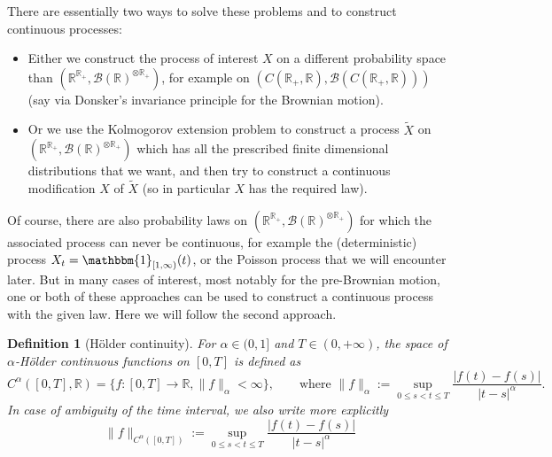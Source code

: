 \documentclass{article}
\newcommand{\coloneq}{:=}
\newcommand{\emph}[1]{{\em #1\/}}
\newenvironment{itemizeminus}{\begin{itemize} \renewcommand{\labelitemi}{$-$}\renewcommand{\labelitemii}{$-$}\renewcommand{\labelitemiii}{$-$}\renewcommand{\labelitemiv}{$-$}}{\end{itemize}}
\newtheorem{definition}{Definition}
{\theorembodyfont{\rmfamily}\newtheorem{example}{Example}}
\newcommand{\1}{\mathbbm{1}}
\begin{document}
There are essentially two ways to solve these problems and to construct
continuous processes:
\begin{itemizeminus}
  \item Either we construct the process of interest $X$ on a different
  probability space than $(\mathbb{R}^{\mathbb{R}_+},
  \mathcal{B}(\mathbb{R})^{\otimes \mathbb{R}_+})$, for example on $(C
  (\mathbb{R}_+, \mathbb{R}), \mathcal{B}(C (\mathbb{R}_+, \mathbb{R})))$ (say
  via Donsker's invariance principle for the Brownian motion).

  \item Or we use the Kolmogorov extension problem to construct a process
  $\tilde{X}$ on $(\mathbb{R}^{\mathbb{R}_+}, \mathcal{B}(\mathbb{R})^{\otimes
  \mathbb{R}_+})$ which has all the prescribed finite dimensional
  distributions that we want, and then try to construct a continuous
  modification $X$ of $\tilde{X}$ (so in particular $X$ has the required law).
\end{itemizeminus}
Of course, there are also probability laws on $(\mathbb{R}^{\mathbb{R}_+},
\mathcal{B}(\mathbb{R})^{\otimes \mathbb{R}_+})$ for which the associated
process can never be continuous, for example the (deterministic) process $X_t
=\mathbbm{1}_{[1, \infty)} (t)$, or the Poisson process that we will encounter
later. But in many cases of interest, most notably for the pre-Brownian
motion, one or both of these approaches can be used to construct a continuous
process with the given law. Here we will follow the second approach.

\begin{definition}[H{\"o}lder continuity]
  For $\alpha \in (0, 1]$ and $T \in (0, + \infty)$, the space of
  $\alpha$-{\emph{H{\"o}lder continuous}} functions on $[0, T]$ is defined as
  \[ C^{\alpha} ([0, T], \mathbb{R}) = \{f : [0, T] \rightarrow \mathbb{R},
     \|f\|_{\alpha} < \infty\}, \qquad \text{where } \|f\|_{\alpha} \coloneq
     \sup_{0 \le s < t \le T}  \frac{|f (t) - f (s) |}{|t - s|^{\alpha}} . \]
  In case of ambiguity of the time interval, we also write more explicitly
  \[ \|f\|_{C^{\alpha} ([0, T])} \coloneq \sup_{0 \le s < t \le T}  \frac{|f
     (t) - f (s) |}{|t - s|^{\alpha}} \]
\end{definition}
\end{document}
